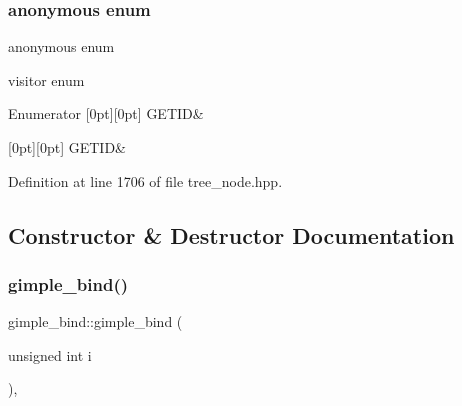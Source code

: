 \subsubsection{\texorpdfstring{anonymous enum}{anonymous enum}}
{\footnotesize\ttfamily anonymous enum}



visitor enum 

\begin{DoxyEnumFields}{Enumerator}
[0pt][0pt]{}\mbox{\label{structgimple__bind_a25674d4023cf24f1df44d722285a161aa33ff0e386da6380d52ef6aa200d43de1}} 
G\+E\+T\+ID&\\
\hline

[0pt][0pt]{}\mbox{\label{structgimple__bind_a25674d4023cf24f1df44d722285a161aa33ff0e386da6380d52ef6aa200d43de1}} 
G\+E\+T\+ID&\\
\hline

\end{DoxyEnumFields}


Definition at line 1706 of file tree\+\_\+node.\+hpp.



\subsection{Constructor \& Destructor Documentation}
\mbox{\label{structgimple__bind_a9d2ff8f163b9f89de2ce3f23991a507e}} 
\subsubsection{\texorpdfstring{gimple\+\_\+bind()}{gimple\_bind()}}
{\footnotesize\ttfamily gimple\+\_\+bind\+::gimple\+\_\+bind (\begin{DoxyParamCaption}\item[{unsigned int}]{i }\end{DoxyParamCaption})\hspace{0.3cm}{\ttfamily [inline]}, {\ttfamily [explicit]}}



